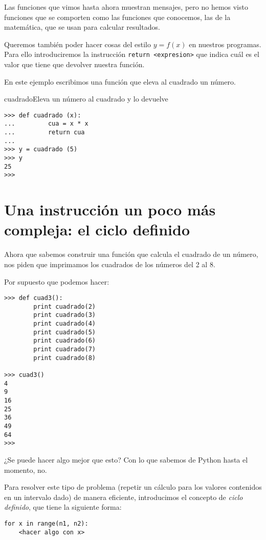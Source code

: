 Las funciones que vimos hasta ahora muestran mensajes,
pero no hemos visto funciones que se comporten como las
funciones que conocemos, las de la matemática, que
se usan para calcular resultados.

Queremos también poder hacer cosas del estilo $y=f(x)$
en nuestros programas.
Para ello introduciremos la instrucción \lstinline!return <expresion>!
que indica cuál es el valor que tiene que devolver nuestra función.

En este ejemplo escribimos una función que eleva al cuadrado un número.

\begin{codigo}{cuadrado}{Eleva un número al cuadrado y lo devuelve}
\label{cuadrado}
\begin{lstlisting}[numbers=none]
>>> def cuadrado (x):
...         cua = x * x
...         return cua
...
>>> y = cuadrado (5)
>>> y
25
>>>
\end{lstlisting}
\end{codigo}

\section{Una instrucción un poco más compleja: el ciclo definido}

\begin{problema}Ahora que sabemos construir una función que calcula el cuadrado de un número,
nos piden que imprimamos los cuadrados de los números del 2 al 8.
\end{problema}

\begin{solucion}
Por supuesto que podemos hacer:
\begin{lstlisting}[numbers=none]
>>> def cuad3():
        print cuadrado(2)
        print cuadrado(3)
        print cuadrado(4)
        print cuadrado(5)
        print cuadrado(6)
        print cuadrado(7)
        print cuadrado(8)

>>> cuad3()
4
9
16
25
36
49
64
>>>
\end{lstlisting}
\end{solucion}

¿Se puede hacer algo mejor que esto? Con lo que sabemos de Python hasta el momento, no.

Para resolver este tipo de problema (repetir un cálculo para los valores
contenidos en un intervalo dado) de manera eficiente, introducimos el concepto
de {\it ciclo definido}, que tiene la siguiente forma:

\begin{lstlisting}[numbers=none]
for x in range(n1, n2):
	<hacer algo con x>
\end{lstlisting}

